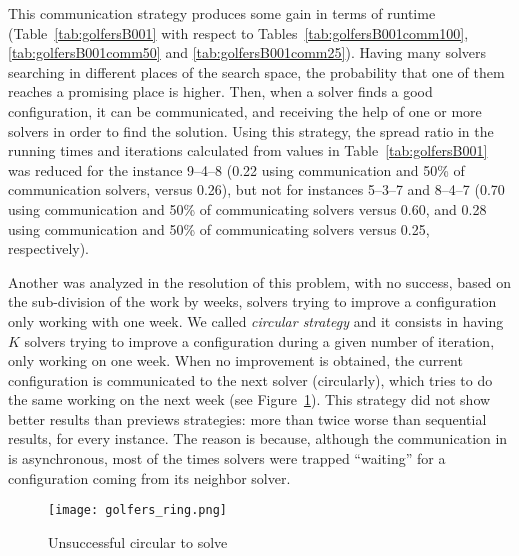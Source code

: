 This communication strategy produces some gain in terms of runtime (Table~\ref{tab:golfersB001} with respect to Tables~\ref{tab:golfersB001comm100}, \ref{tab:golfersB001comm50} and \ref{tab:golfersB001comm25}). 
Having many solvers searching in different places of the search space, the probability that one of them reaches a promising place is higher. Then, when a solver finds a good configuration, it can be communicated, and receiving the help of one or more solvers in order to find the solution.
Using this strategy, the spread ratio in the running times and iterations calculated from values in Table~\ref{tab:golfersB001} was reduced for the instance 9--4--8 (0.22 using communication \oneTone{} and 50\% of communication solvers, versus 0.26), but not for instances 5--3--7 and 8--4--7 (0.70 using communication \oneTn{} and 50\% of communicating solvers versus 0.60, and 0.28 using communication \oneTone{} and 50\% of communicating solvers versus 0.25, respectively).


Another \commstr{} was analyzed in the resolution of this problem, with no success, based on the sub-division of the work by weeks, \ie solvers trying to improve a configuration only working with one week. We called \textit{circular strategy}  and it consists in having $K$ solvers trying to improve a configuration during a given number of iteration, only working on one week. When no improvement is obtained, the current configuration is communicated to the next solver (circularly), which tries to do the same working on the next week (see Figure~\ref{subfig:golfers_bad_ring}).
This strategy did not show better results than previews strategies: more than twice worse than sequential results, for every instance. The reason is because, although the communication in \posl{} is asynchronous, most of the times solvers were trapped ``waiting'' for a configuration coming from its neighbor solver.

\begin{figure}[h]
\centering
\texttt{[image: golfers\_ring.png]}	
\caption[]{Unsuccessful circular \commstr{} to solve \SGP}
\label{subfig:golfers_bad_ring}
\end{figure}

